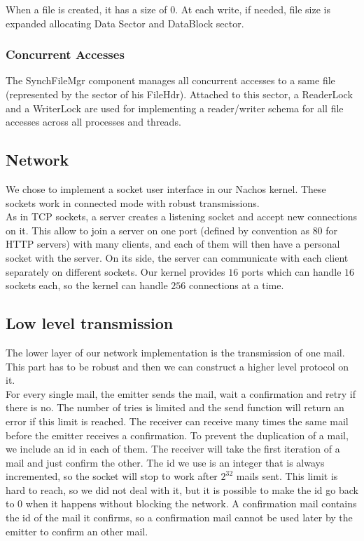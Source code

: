 When a file is created, it has a size of $0$. At each write, if needed, file size is
expanded allocating Data Sector and DataBlock sector.

\subsubsection{Concurrent Accesses}
The SynchFileMgr component manages all concurrent accesses to a same file
(represented by the sector of his FileHdr). Attached to this sector, a
ReaderLock and a WriterLock are used for implementing a reader/writer schema for
all file accesses across all processes and threads.

\subsection{Network}
We chose to implement a socket user interface in our Nachos kernel. These
sockets work in connected mode with robust transmissions.\\
As in TCP sockets, a server creates a listening socket and accept new
connections on it. This allow to join a server on one port (defined by
convention as $80$ for HTTP servers) with many clients, and each of them will then
have a personal socket with the server.
On its side, the server can communicate with each client separately on
different sockets. Our kernel provides $16$ ports which can handle $16$ sockets
each, so the kernel can handle $256$ connections at a time.

\subsection{Low level transmission}
The lower layer of our network implementation is the transmission of one mail.
This part has to be robust and then we can construct a higher level protocol
on it.\\
For every single mail, the emitter sends the mail, wait a confirmation and retry
if there is no. The number of tries is limited and the send function will return an
error if this limit is reached.
The receiver can receive many times the same mail before the emitter receives a
confirmation. To prevent the duplication of a mail, we include an id in each of
them. The receiver will take the first iteration of a mail and just confirm the
other. The id we use is an integer that is always incremented, so the socket will stop
to work after $2^{32}$ mails sent. This limit is hard to reach, so we did not
deal with it, but it is possible to make the id go back to $0$ when it happens
without blocking the network.
A confirmation mail contains the id of the mail it confirms, so a confirmation
mail cannot be used later by the emitter to confirm an other mail.

